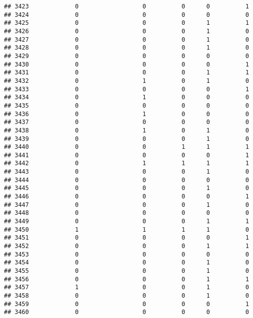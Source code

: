 \documentclass[
]{article}
\begin{document}
\begin{verbatim}
## 3423             0                  0          0      0          1
## 3424             0                  0          0      0          0
## 3425             0                  0          0      1          1
## 3426             0                  0          0      1          0
## 3427             0                  0          0      1          0
## 3428             0                  0          0      1          0
## 3429             0                  0          0      0          0
## 3430             0                  0          0      0          1
## 3431             0                  0          0      1          1
## 3432             0                  1          0      1          0
## 3433             0                  0          0      0          1
## 3434             0                  1          0      0          0
## 3435             0                  0          0      0          0
## 3436             0                  1          0      0          0
## 3437             0                  0          0      0          0
## 3438             0                  1          0      1          0
## 3439             0                  0          0      1          0
## 3440             0                  0          1      1          1
## 3441             0                  0          0      0          1
## 3442             0                  1          1      1          1
## 3443             0                  0          0      1          0
## 3444             0                  0          0      0          0
## 3445             0                  0          0      1          0
## 3446             0                  0          0      0          1
## 3447             0                  0          0      1          0
## 3448             0                  0          0      0          0
## 3449             0                  0          0      1          1
## 3450             1                  1          1      1          0
## 3451             0                  0          0      0          1
## 3452             0                  0          0      1          1
## 3453             0                  0          0      0          0
## 3454             0                  0          0      1          0
## 3455             0                  0          0      1          0
## 3456             0                  0          0      1          1
## 3457             1                  0          0      1          0
## 3458             0                  0          0      1          0
## 3459             0                  0          0      0          1
## 3460             0                  0          0      0          0

\end{verbatim}
\end{document}
